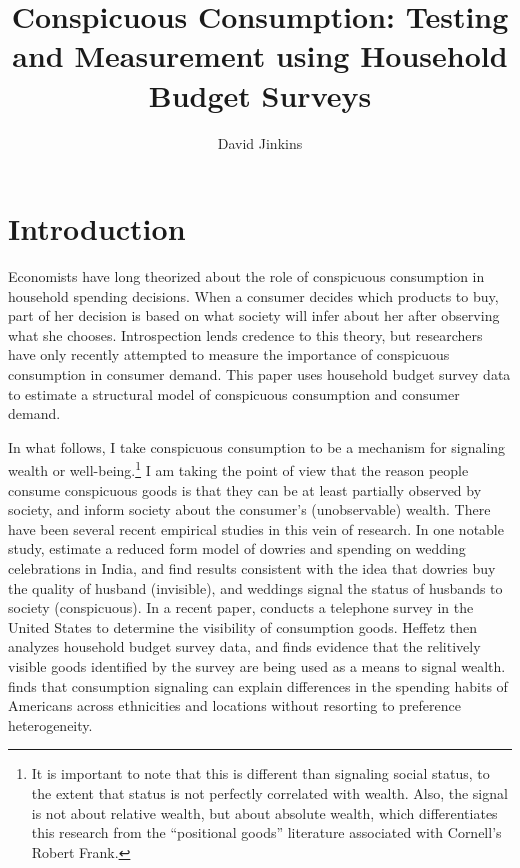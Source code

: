\documentclass{article}
\title{Conspicuous Consumption: Testing and Measurement using Household Budget
Surveys}
\author{David Jinkins}
\begin{document}
\maketitle

\section{Introduction}
Economists have long theorized about the role of conspicuous consumption in household spending decisions.  
When a consumer decides which products to buy, part of her decision is based on what society will infer about her after observing what she chooses.  
Introspection lends credence to this theory, but researchers have only recently attempted to measure the importance of conspicuous consumption in consumer demand.  
This paper uses household budget survey data to estimate a structural model of conspicuous consumption and consumer demand.  


In what follows, I take conspicuous consumption to be a mechanism for signaling wealth or well-being.\footnote{It is important to note that this is different than signaling social status, to the extent that status is not perfectly correlated with wealth.  Also, the signal is not about relative wealth, but about absolute wealth, which differentiates this research from the ``positional goods'' literature associated with Cornell's Robert Frank.}  
I am taking the point of view that the reason people consume conspicuous goods is that they can be at least partially observed by society, and inform society about the consumer's (unobservable) wealth.  
There have been several recent empirical studies in this vein of research.  
In one notable study, \citet{Blochetal2004} estimate a reduced form model of dowries and spending on wedding celebrations in India, and find results consistent with the idea that dowries buy the quality of husband (invisible), and weddings signal the status of husbands to society (conspicuous).  
In a recent paper, \citet{Heffetz2011} conducts a telephone survey in the United States to determine the visibility of consumption goods.  Heffetz then analyzes household budget survey data, and finds evidence that the relitively visible goods identified by the survey are being used as a means to signal wealth. 
\citet{Charlesetal2009} finds that consumption signaling can explain differences in the spending habits of Americans across ethnicities and locations without resorting to preference heterogeneity.
\end{document}
